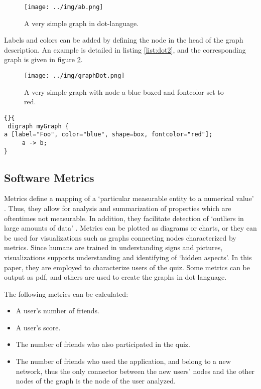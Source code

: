 \documentclass[preprint,12pt]{elsarticle}
\begin{document}
\begin{figure}
  \texttt{[image: ../img/ab.png]}
\caption{A very simple graph in \ac{dot}-language.}
\label{fig:dot}
\end{figure}

Labels and colors can be added by defining the node in the head of the
graph description. An example is detailed in listing \ref{list:dot2}, and
the corresponding graph is given in figure \ref{fig:dot2}.


\begin{figure}
  \texttt{[image: ../img/graphDot.png]}
\caption{A very simple graph with node a blue boxed and fontcolor set
  to red.}
\label{fig:dot2}
\end{figure}


\begin{lstlisting}[caption=A very simple DOT-Graph,
  label=list:dot2]{}{
 digraph myGraph {
a [label="Foo", color="blue", shape=box, fontcolor="red"];
     a -> b;
}
\end{lstlisting}

\subsection{Software Metrics}
\label{sec:metrics}
Metrics define a mapping of a `particular measurable entity to a
numerical value' \cite{Lanz06a}. Thus, they allow for analysis and summarization
of properties which are oftentimes not measurable. In addition, they
facilitate detection of `outliers in large amounts of data'
\cite{Lanz06a}. Metrics can be plotted as diagrams or charts, or they
can be used for visualizations such as graphs connecting nodes
characterized by metrics. Since humans are trained in understanding signs and
pictures, visualizations supports understanding and identifying of
`hidden aspects'. \cite{Lanz06a} In this paper, they are
employed to characterize users of the quiz. Some metrics can be output
as \ac{pdf}, and others are used to create the graphs in \ac{dot} language.

The following metrics can be calculated:

\begin{itemize}
\item A user's number of friends.
\item A user's score.
\item The number of friends who also participated in the quiz.
\item The number of friends who used the application, and belong to a
new network, thus the only connector between the new users' nodes and
the other nodes of the graph is the node of the user analyzed.
\end{itemize}
\end{document}
